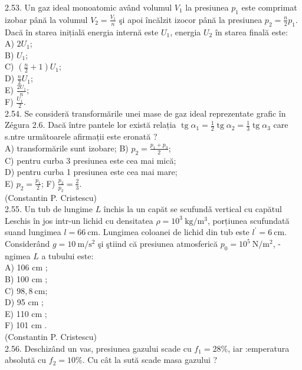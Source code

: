 \documentclass[10pt]{article}
\begin{document}
2.53. Un gaz ideal monoatomic având volumul $V_{1}$ la presiunea $p_{1}$ este comprimat izobar până la volumul $V_{2}=\frac{V_{1}}{n}$ şi apoi încălzit izocor până la presiunea $p_{2}=\frac{n}{2} p_{1}$. Dacă în starea inițială energia internă este $U_{1}$, energia $U_{2}$ în starea finală este:\\
A) $2 U_{1}$;\\
B) $U_{1}$;\\
C) $\left(\frac{n}{2}+1\right) U_{1}$;\\
D) $\frac{n}{2} U_{1}$;\\
E) $\frac{2 U_{1}}{n}$;\\
F) $\frac{U_{1}}{2}$.\\
2.54. Se consideră transformările unei mase de gaz ideal reprezentate grafic în Zégura 2.6. Dacă între pantele lor există relația $\operatorname{tg} \alpha_{1}=\frac{1}{2} \operatorname{tg} \alpha_{2}=\frac{1}{3} \operatorname{tg} \alpha_{3}$ care s.ntre următoarele afirmații este eronată ?\\
A) transformările sunt izobare; B) $p_{2}=\frac{p_{1}+p_{3}}{2}$;\\
C) pentru curba 3 presiunea este cea mai mică;\\
D) pentru curba 1 presiunea este cea mai mare;\\
E) $p_{2}=\frac{p_{1}}{2}$; F) $\frac{p_{3}}{p_{2}}=\frac{2}{3}$.\\
(Constantin P. Cristescu)\\
2.55. Un tub de lungime $L$ închis la un capăt se scufundǎ vertical cu capătul Leschis în jos intr-un lichid cu densitatea $\rho=10^{3} \mathrm{~kg} / \mathrm{m}^{3}$, porțiunea scufundată suand lungimea $l=66 \mathrm{~cm}$. Lungimea coloanei de lichid din tub este $l^{\prime}=6 \mathrm{~cm}$. Considerând $g=10 \mathrm{~m} / \mathrm{s}^{2}$ şi ştiind că presiunea atmosferică $p_{0}=10^{5} \mathrm{~N} / \mathrm{m}^{2}$, -ngimea $L$ a tubului este:\\
A) 106 cm ;\\
B) 100 cm ;\\
C) $98,8 \mathrm{~cm}$;\\
D) 95 cm ;\\
E) 110 cm ;\\
F) 101 cm .\\
(Constantin P. Cristescu)\\
2.56. Deschizând un vas, presiunea gazului scade cu $f_{1}=28 \%$, iar :emperatura absolută cu $f_{2}=10 \%$. Cu cât la sută scade masa gazului ?\\
\end{document}

